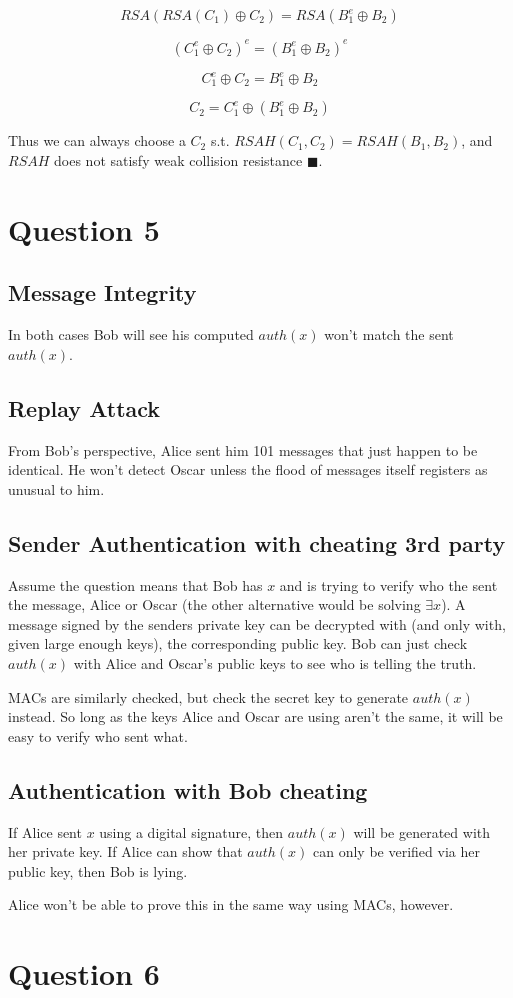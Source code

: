 \documentclass[a4paper,10pt]{article}
\begin{document}
$$RSA(RSA(C_{1}) \oplus C_{2} ) =  RSA(B_{1}^{e} \oplus B_{2} )$$

$$(C_{1}^{e} \oplus C_{2} )^{e} =  (B_{1}^{e} \oplus B_{2} )^{e}$$

$$C_{1}^{e} \oplus C_{2} =  B_{1}^{e} \oplus B_{2} $$

$$C_{2} =  C_{1}^{e} \oplus (B_{1}^{e} \oplus B_{2}) $$


Thus we can always choose a $C_{2}$ s.t. $RSAH(C_{1},C_{2}) = RSAH(B_{1},B_{2})$, and $RSAH$ does not satisfy weak collision resistance $\blacksquare$.
\pagebreak

\section{Question 5}

\subsection{Message Integrity}
In both cases Bob will see his computed $auth(x)$ won't match the sent $auth(x)$.

\subsection{Replay Attack} 
From Bob's perspective, Alice sent him 101 messages that just happen to be identical.  He won't detect Oscar unless the flood of messages itself registers as unusual to him. 

\subsection{Sender Authentication with cheating 3rd party}
Assume the question means that Bob has $x$ and is trying to verify who the sent the message, Alice or Oscar (the other alternative would be solving $\exists x$).  A message signed by the senders private key can be decrypted with (and only with, given large enough keys), the corresponding public key.  Bob can just check $auth(x)$ with Alice and Oscar's public keys to see who is telling the truth.

MACs are similarly checked, but check the secret key to generate $auth(x)$ instead.  So long as the keys Alice and Oscar are using aren't the same, it will be easy to verify who sent what.

\subsection{Authentication with Bob cheating}

If Alice sent $x$ using a digital signature, then $auth(x)$ will be generated with her private key. If Alice can show that $auth(x)$ can only be verified via her public key, then Bob is lying.

Alice won't be able to prove this in the same way using MACs, however.

\section{Question 6}
\end{document}
